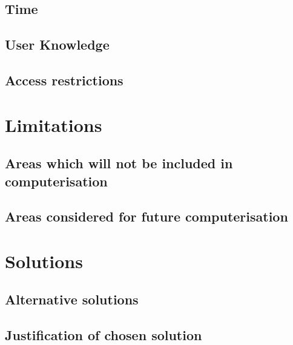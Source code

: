\subsection{Time}

\subsection{User Knowledge}

\subsection{Access restrictions}

\section{Limitations}

\subsection{Areas which will not be included in computerisation}

\subsection{Areas considered for future computerisation}

\section{Solutions}

\subsection{Alternative solutions}

\subsection{Justification of chosen solution}